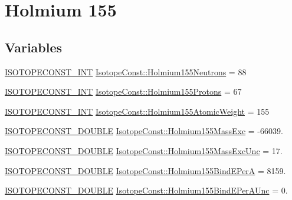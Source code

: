 \hypertarget{group___isotope_const-_holmium-_ho155}{}\section{Holmium 155}
\label{group___isotope_const-_holmium-_ho155}
\subsection*{Variables}
\begin{DoxyCompactItemize}
\item 
\mbox{\hyperlink{group___isotope_const-_macros_ga5f18360b3e99483a35c32d789e62621c}{I\+S\+O\+T\+O\+P\+E\+C\+O\+N\+S\+T\+\_\+\+I\+NT}} \mbox{\hyperlink{group___isotope_const-_holmium-_ho155_ga18c85cd3653fa20063a7c86bca9be556}{Isotope\+Const\+::\+Holmium155\+Neutrons}} = 88
\item 
\mbox{\hyperlink{group___isotope_const-_macros_ga5f18360b3e99483a35c32d789e62621c}{I\+S\+O\+T\+O\+P\+E\+C\+O\+N\+S\+T\+\_\+\+I\+NT}} \mbox{\hyperlink{group___isotope_const-_holmium-_ho155_ga743b3027743db0fdd7cd56a86b60f684}{Isotope\+Const\+::\+Holmium155\+Protons}} = 67
\item 
\mbox{\hyperlink{group___isotope_const-_macros_ga5f18360b3e99483a35c32d789e62621c}{I\+S\+O\+T\+O\+P\+E\+C\+O\+N\+S\+T\+\_\+\+I\+NT}} \mbox{\hyperlink{group___isotope_const-_holmium-_ho155_ga8858465583e973787a65afed1b830c6d}{Isotope\+Const\+::\+Holmium155\+Atomic\+Weight}} = 155
\item 
\mbox{\hyperlink{group___isotope_const-_macros_ga8f45a7272ce02c0b4c65c44636ed719a}{I\+S\+O\+T\+O\+P\+E\+C\+O\+N\+S\+T\+\_\+\+D\+O\+U\+B\+LE}} \mbox{\hyperlink{group___isotope_const-_holmium-_ho155_ga0bf0da7aa63f0deacce185ef864fb22e}{Isotope\+Const\+::\+Holmium155\+Mass\+Exc}} = -\/66039.
\item 
\mbox{\hyperlink{group___isotope_const-_macros_ga8f45a7272ce02c0b4c65c44636ed719a}{I\+S\+O\+T\+O\+P\+E\+C\+O\+N\+S\+T\+\_\+\+D\+O\+U\+B\+LE}} \mbox{\hyperlink{group___isotope_const-_holmium-_ho155_ga32fabf1523d8b2f82621372e462b1801}{Isotope\+Const\+::\+Holmium155\+Mass\+Exc\+Unc}} = 17.
\item 
\mbox{\hyperlink{group___isotope_const-_macros_ga8f45a7272ce02c0b4c65c44636ed719a}{I\+S\+O\+T\+O\+P\+E\+C\+O\+N\+S\+T\+\_\+\+D\+O\+U\+B\+LE}} \mbox{\hyperlink{group___isotope_const-_holmium-_ho155_ga12718758f93174aba7a13121e333f3d8}{Isotope\+Const\+::\+Holmium155\+Bind\+E\+PerA}} = 8159.
\item 
\mbox{\hyperlink{group___isotope_const-_macros_ga8f45a7272ce02c0b4c65c44636ed719a}{I\+S\+O\+T\+O\+P\+E\+C\+O\+N\+S\+T\+\_\+\+D\+O\+U\+B\+LE}} \mbox{\hyperlink{group___isotope_const-_holmium-_ho155_gaf18ea56a05a67adf2cd9b31fb30d7349}{Isotope\+Const\+::\+Holmium155\+Bind\+E\+Per\+A\+Unc}} = 0.

\end{DoxyCompactItemize}
